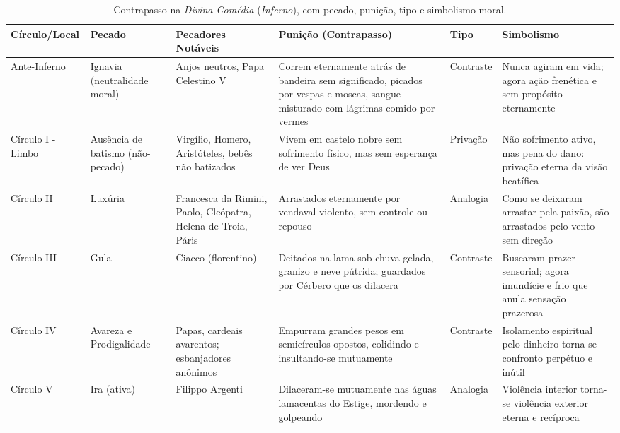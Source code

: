 \begingroup
  \scriptsize
  \renewcommand{\arraystretch}{1.2}
  \begin{longtable}{|>{\raggedright\arraybackslash}p{1.35cm}|>{\raggedright\arraybackslash}p{1.55cm}|>{\raggedright\arraybackslash}p{1.9cm}|>{\raggedright\arraybackslash}p{3.1cm}|>{\raggedright\arraybackslash}p{1.25cm}|>{\raggedright\arraybackslash}p{3.5cm}|}
    \caption{Contrapasso na \emph{Divina Comédia} (\emph{Inferno}), com pecado, punição, tipo e simbolismo moral.}\label{tab:contrapasso}\\
    \hline
    \textbf{Círculo/\allowbreak Local} & \textbf{Pecado} & \textbf{Pecadores Notáveis} & \textbf{Punição (Contrapasso)} & \textbf{Tipo} & \textbf{Simbolismo} \\
    \hline
    Ante-Inferno & Ignavia (neutralidade moral) & Anjos neutros, Papa Celestino V & Correm eternamente atrás de bandeira sem significado, picados por vespas e moscas, sangue misturado com lágrimas comido por vermes & Contraste & Nunca agiram em vida; agora ação frenética e sem propósito eternamente \\
    \hline
    Círculo I - Limbo & Ausência de batismo (não-pecado) & Virgílio, Homero, Aristóteles, bebês não batizados & Vivem em castelo nobre sem sofrimento físico, mas sem esperança de ver Deus & Privação & Não sofrimento ativo, mas pena do dano: privação eterna da visão beatífica \\
    \hline
    Círculo II & Luxúria & Francesca da Rimini, Paolo, Cleópatra, Helena de Troia, Páris & Arrastados eternamente por vendaval violento, sem controle ou repouso & Analogia & Como se deixaram arrastar pela paixão, são arrastados pelo vento sem direção \\
    \hline
    Círculo III & Gula & Ciacco (florentino) & Deitados na lama sob chuva gelada, granizo e neve pútrida; guardados por Cérbero que os dilacera & Contraste & Buscaram prazer sensorial; agora imundície e frio que anula sensação prazerosa \\
    \hline
    Círculo IV & Avareza e Prodigalidade & Papas, cardeais avarentos; esbanjadores anônimos & Empurram grandes pesos em semicírculos opostos, colidindo e insultando-se mutuamente & Contraste & Isolamento espiritual pelo dinheiro torna-se confronto perpétuo e inútil \\
    \hline
    Círculo V & Ira (ativa) & Filippo Argenti & Dilaceram-se mutuamente nas águas lamacentas do Estige, mordendo e golpeando & Analogia & Violência interior torna-se violência exterior eterna e recíproca \\

\end{longtable}

